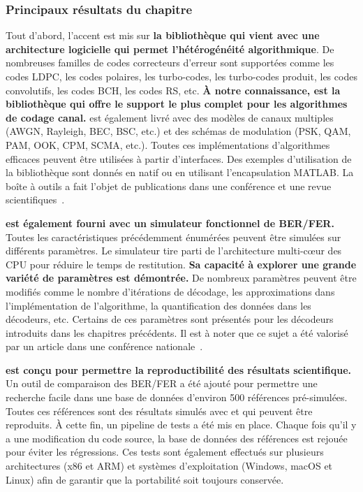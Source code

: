 \subsubsection*{Principaux résultats du chapitre}

Tout d'abord, l'accent est mis sur \textbf{la bibliothèque \AFFECT qui vient
avec une architecture logicielle qui permet l'hétérogénéité algorithmique}. De
nombreuses familles de codes correcteurs d'erreur sont supportées comme les
codes LDPC, les codes polaires, les turbo-codes, les turbo-codes produit, les
codes convolutifs, les codes BCH, les codes RS, etc. \textbf{À notre
connaissance, \AFFECT est la bibliothèque qui offre le support le plus complet
pour les algorithmes de codage canal.} \AFFECT est également livré avec des
modèles de canaux multiples (AWGN, Rayleigh, BEC, BSC, etc.) et des schémas de
modulation (PSK, QAM, PAM, OOK, CPM, SCMA, etc.). Toutes ces implémentations
d'algorithmes efficaces peuvent être utilisées à partir d'interfaces. Des
exemples d'utilisation de la bibliothèque sont donnés en natif \Cxx ou en
utilisant l'encapsulation MATLAB\R. La boîte à outils \AFFECT a fait l'objet de
publications dans une conférence et une revue scientifiques~\cite{Cassagne2017a,
Cassagne2019a}.

\textbf{\AFFECT est également fourni avec un simulateur fonctionnel de BER/FER.}
Toutes les caractéristiques précédemment énumérées peuvent être simulées sur
différents paramètres. Le simulateur tire parti de l'architecture multi-cœur des
CPU pour réduire le temps de restitution. \textbf{Sa capacité à explorer une
grande variété de paramètres est démontrée.} De nombreux paramètres peuvent être
modifiés comme le nombre d'itérations de décodage, les approximations dans
l'implémentation de l'algorithme, la quantification des données dans les
décodeurs, etc. Certains de ces paramètres sont présentés pour les décodeurs
introduits dans les chapitres précédents. Il est à noter que ce sujet a été
valorisé par un article dans une conférence nationale~\cite{Cassagne2017}.

\textbf{\AFFECT est conçu pour permettre la reproductibilité des résultats
scientifique.} Un outil de comparaison des BER/FER a été ajouté pour permettre
une recherche facile dans une base de données d'environ 500 références
pré-simulées. Toutes ces références sont des résultats simulés avec \AFFECT et
qui peuvent être reproduits. À cette fin, un pipeline de tests a été mis en
place. Chaque fois qu'il y a une modification du code source, la base de données
des références est rejouée pour éviter les régressions. Ces tests sont également
effectués sur plusieurs architectures (x86 et ARM\R) et systèmes d'exploitation
(Windows, macOS et Linux) afin de garantir que la portabilité soit toujours
conservée.

